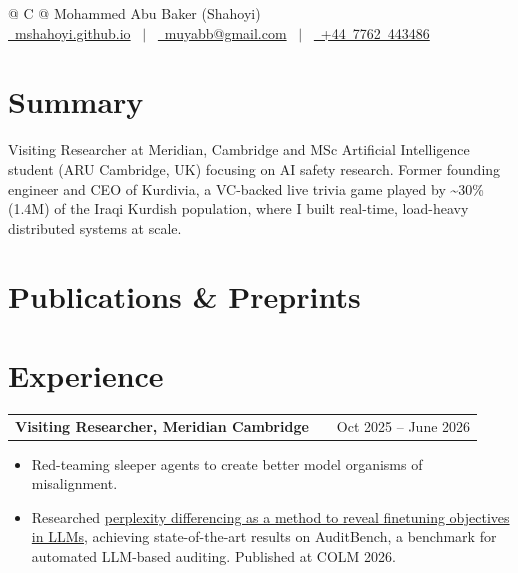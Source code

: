 \documentclass[a4paper,12pt]{article}
\makeatletter
\newenvironment{joblong}[2]
    {
    \begin{tabularx}{\linewidth}{@{}l X r@{}}
    \textbf{#1} & \hfill &  #2 \\[3.75pt]
    \end{tabularx}
    \begin{minipage}[t]{\linewidth}
    \begin{itemize}[nosep,after=\strut, leftmargin=1em, itemsep=3pt,label=--]
    }
    {
    \end{itemize}
    \end{minipage}    
    }
\makeatother
\begin{document}
\pagestyle{empty} 


\begin{tabularx}{\linewidth}{@{} C @{}}
\Huge{Mohammed Abu Baker (Shahoyi)} \\[7.5pt]
\href{https://mshahoyi.github.io}{\raisebox{-0.05\height}\faGlobe \ mshahoyi.github.io} \ $|$ \ 
\href{mailto:muyabb@gmail.com}{\raisebox{-0.05\height}\faEnvelope \ muyabb@gmail.com} \ $|$ \ 
\href{tel:+447762443486}{\raisebox{-0.05\height}\faMobile \ +44\ 7762\ 443486} \\
\end{tabularx}


\section{Summary}
Visiting Researcher at Meridian, Cambridge and MSc Artificial Intelligence student (ARU Cambridge, UK) focusing on AI safety research. Former founding engineer and CEO of Kurdivia, a VC-backed live trivia game played by \textasciitilde30\% (1.4M) of the Iraqi Kurdish population, where I built real-time, load-heavy distributed systems at scale.


\section{Publications \& Preprints}
\begin{refsection}[citations.bib]
\nocite{*}
\printbibliography[heading=none]
\end{refsection}

\section{Experience}

\begin{joblong}{Visiting Researcher, Meridian Cambridge}{Oct 2025 -- June 2026}

\item Red-teaming sleeper agents to create better model organisms of misalignment.
\item Researched \href{https://arxiv.org/abs/2605.00994}{perplexity differencing as a method to reveal finetuning objectives in LLMs}, achieving state-of-the-art results on AuditBench, a benchmark for automated LLM-based auditing. Published at COLM 2026.

\end{joblong}
\end{document}
